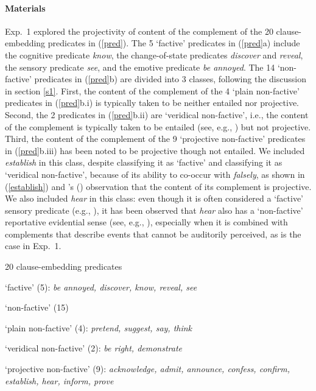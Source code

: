 \documentclass[11pt,fleqn]{article}
\newcommand{\6}{\mbox{$[\hspace*{-.6mm}[$}}
\newcommand{\9}{\mbox{$]\hspace*{-.6mm}]$}}
\newcommand{\citetpos}[1]{\citeauthor{#1}'s (\citeyear{#1})}
\begin{document}
\paragraph{Materials} Exp.~1 explored the projectivity of content of the complement of the 20 clause-embedding predicates in (\ref{pred}). The 5 `factive' predicates in (\ref{pred}a) include the cognitive predicate {\em know}, the change-of-state predicates {\em discover} and {\em reveal}, the sensory predicate {\em see}, and the emotive predicate {\em be annoyed}. The 14 `non-factive' predicates in (\ref{pred}b) are divided into 3 classes, following the discussion in section \ref{s1}. First, the content of the complement of the 4 `plain non-factive' predicates in (\ref{pred}b.i) is typically taken to be neither entailed nor projective. Second, the 2 predicates in  (\ref{pred}b.ii) are `veridical non-factive', i.e., the content of the complement is typically taken to be entailed (see, e.g., \citealt{anand-hacquard2014}) but not projective. Third, the content of the complement of the 9 `projective non-factive' predicates in  (\ref{pred}b.iii)  has been noted to be projective though not entailed. We included  {\em establish} in this class, despite \citet{wyse} classifying it as `factive' and \citet{swanson2012} classifying it as `veridical non-factive', because of its ability to co-occur with {\em falsely}, as shown in (\ref{establish}) and \citetpos{tbd-variability} observation that the content of its complement is projective. We also included {\em hear} in this class: even though it is often considered a `factive' sensory predicate (e.g., \citealt{beaver-belly,anand-hacquard2014}), it has been observed that {\em hear} also has a `non-factive' reportative evidential sense (see, e.g., \citealt{anderson86,simons07}), especially when it is combined with complements that describe events that cannot be auditorily perceived, as is the case in Exp.~1. 


\begin{exe}
\ex\label{pred} 20 clause-embedding predicates 

\begin{xlist}

\ex `factive' (5): {\em be annoyed, discover, know, reveal, see}

\ex `non-factive' (15)

\begin{xlist}

\ex `plain non-factive' (4): {\em pretend, suggest, say, think}

\ex `veridical non-factive' (2): {\em be right, demonstrate}

\ex `projective non-factive' (9): {\em acknowledge, admit, announce, confess, confirm, establish, hear, inform, prove}


\end{xlist}

\end{xlist}

\end{exe}
\end{document}

